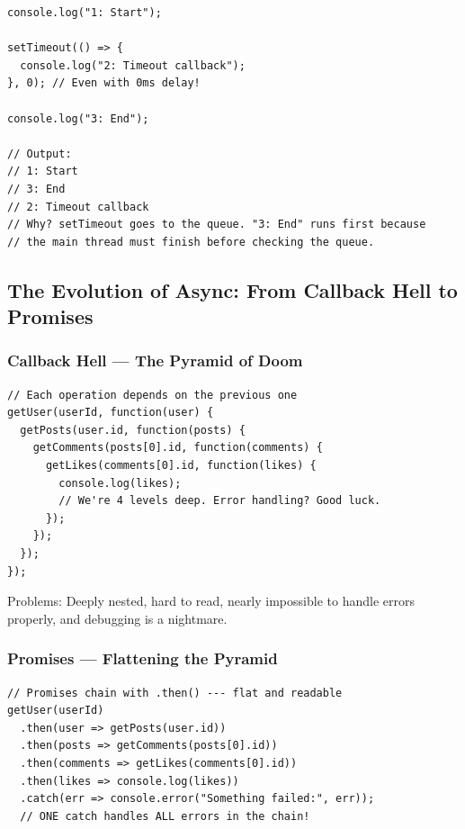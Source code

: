 \documentclass[12pt]{article}
\begin{document}
\begin{lstlisting}
console.log("1: Start");

setTimeout(() => {
  console.log("2: Timeout callback");
}, 0); // Even with 0ms delay!

console.log("3: End");

// Output:
// 1: Start
// 3: End
// 2: Timeout callback
// Why? setTimeout goes to the queue. "3: End" runs first because
// the main thread must finish before checking the queue.
\end{lstlisting}

\subsection{The Evolution of Async: From Callback Hell to Promises}

\subsubsection*{Callback Hell --- The Pyramid of Doom}

\begin{badway}
\begin{lstlisting}
// Each operation depends on the previous one
getUser(userId, function(user) {
  getPosts(user.id, function(posts) {
    getComments(posts[0].id, function(comments) {
      getLikes(comments[0].id, function(likes) {
        console.log(likes);
        // We're 4 levels deep. Error handling? Good luck.
      });
    });
  });
});
\end{lstlisting}
\end{badway}

Problems: Deeply nested, hard to read, nearly impossible to handle errors properly, and debugging is a nightmare.

\subsubsection*{Promises --- Flattening the Pyramid}

\begin{proway}
\begin{lstlisting}
// Promises chain with .then() --- flat and readable
getUser(userId)
  .then(user => getPosts(user.id))
  .then(posts => getComments(posts[0].id))
  .then(comments => getLikes(comments[0].id))
  .then(likes => console.log(likes))
  .catch(err => console.error("Something failed:", err));
  // ONE catch handles ALL errors in the chain!
\end{lstlisting}
\end{proway}
\end{document}
